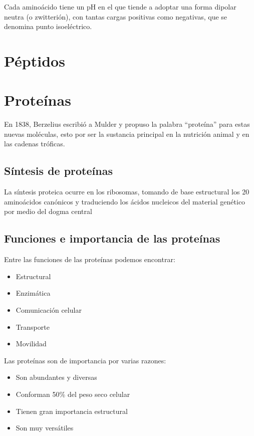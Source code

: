 Cada aminoácido tiene un pH en el que tiende a adoptar una forma dipolar neutra (o zwitterión), con tantas cargas positivas como negativas, que se denomina punto isoeléctrico.

\section{Péptidos}



\section{Proteínas}

En 1838, Berzelius escribió a Mulder y propuso la palabra ``proteína'' para estas nuevas moléculas, esto por ser la sustancia principal en la nutrición animal y en las cadenas tróficas.

\subsection{Síntesis de proteínas}

La síntesis proteica ocurre en los ribosomas, tomando de base estructural los 20 aminoácidos canónicos y traduciendo los ácidos nucleicos del material genético por medio del dogma central

\subsection{Funciones e importancia de las proteínas}

Entre las funciones de las proteínas podemos encontrar:

\begin{itemize}
    \item Estructural
    \item Enzimática
    \item Comunicación celular
    \item Transporte
    \item Movilidad
\end{itemize}

Las proteínas son de importancia por varias razones:

\begin{itemize}
    \item Son abundantes y diversas
    \item Conforman 50\% del peso seco celular
    \item Tienen gran importancia estructural
    \item Son muy versátiles
\end{itemize}